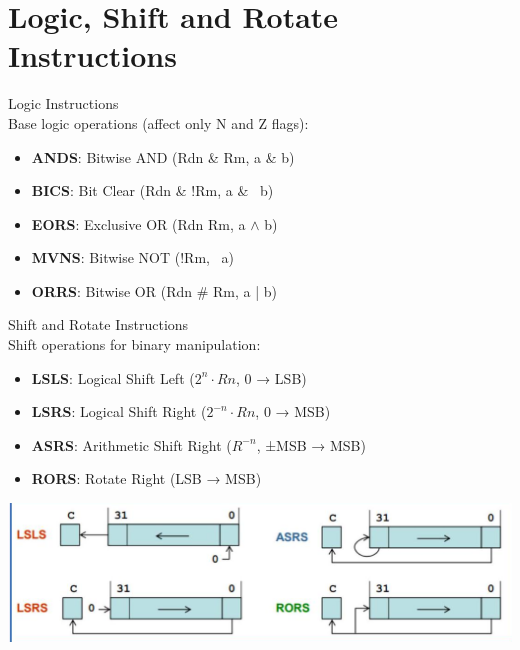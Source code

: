 \section{Logic, Shift and Rotate Instructions}

\begin{concept}{Logic Instructions}\\
Base logic operations (affect only N and Z flags):
\begin{itemize}
  \item \textbf{ANDS}: Bitwise AND (Rdn \& Rm, a \& b)
  \item \textbf{BICS}: Bit Clear (Rdn \& !Rm, a \& ~b)
  \item \textbf{EORS}: Exclusive OR (Rdn \textdollar Rm, a $\wedge$  b)
  \item \textbf{MVNS}: Bitwise NOT (!Rm, ~a)
  \item \textbf{ORRS}: Bitwise OR (Rdn \# Rm, a | b)
\end{itemize}
\end{concept}

\begin{concept}{Shift and Rotate Instructions}\\
Shift operations for binary manipulation:
\begin{itemize}
  \item \textbf{LSLS}: Logical Shift Left ($2^n \cdot Rn$, 0 → LSB)
  \item \textbf{LSRS}: Logical Shift Right ($2^{-n} \cdot Rn$, 0 → MSB)
  \item \textbf{ASRS}: Arithmetic Shift Right ($R^{-n}$, ±MSB → MSB)
  \item \textbf{RORS}: Rotate Right (LSB → MSB)
\end{itemize}

\includegraphics[width=\linewidth]{images/2024_12_29_79e6b22f503fb7b4f718g-06}
\end{concept}


